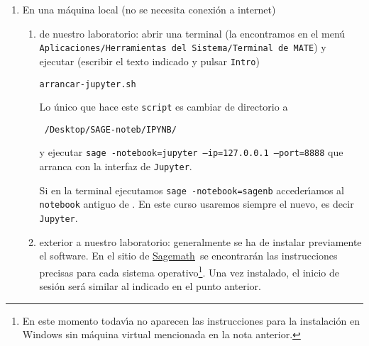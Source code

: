 \begin{enumerate}
\item {\sc En una máquina local} (no se necesita conexión a internet)
 \begin{enumerate}
  \item \label{local}de nuestro laboratorio:  abrir una terminal (la encontramos en el men\'u {\tt Aplicaciones/Herramientas del Sistema/Terminal de MATE}) y
ejecutar (escribir el texto indicado y pulsar {\tt Intro})
\begin{lstlisting}[basicstyle=\color{black},
		backgroundcolor=\color{white},
		numbers=none,linewidth=.25\textwidth]
  arrancar-jupyter.sh
\end{lstlisting}




Lo \'unico que hace este {\tt script} es cambiar de directorio a 
\begin{center}
	{\tt ~/Desktop/SAGE-noteb/IPYNB/}
\end{center} 
\noindent y ejecutar {\tt sage -notebook=jupyter --ip=127.0.0.1 --port=8888} que arranca {\sage} con la interfaz de {\tt Jupyter}. 







Si en la terminal ejecutamos  {\tt sage -notebook=sagenb} acceder\'{\i}amos al {\tt no\-te\-book} antiguo de {\sage}. En este curso usaremos siempre el nuevo, es decir {\tt Jupyter}.

\item exterior a nuestro laboratorio: generalmente se ha de instalar previamente
el software.
En el sitio
de \href{http://www.sagemath.org/download.html}{Sagemath}\, se encontrarán las
instrucciones precisas para cada sistema operativo\footnote{En este momento  todav\'{\i}a no aparecen las instrucciones para la instalaci\'on en Windows sin m\'aquina virtual mencionada en la nota anterior.}. Una vez instalado, el inicio
de sesión será similar al indicado en el punto anterior.

\begin{comment} 
 La  manera de instalar {\sage} en una m\'aquina cuyo sistema operativo sea
MSWindows consiste en instalar una m\'aquina virtual que ejecute Linux y
contenga una versi\'on de {\sage}. %
 
 Puedes ver instrucciones detalladas de instalaci\'on, en  MSWindows, 
en  \href{http://www.sagemath.org/download-windows.html}{este enlace}.
\end{comment}
 

\end{enumerate}
\end{enumerate}
